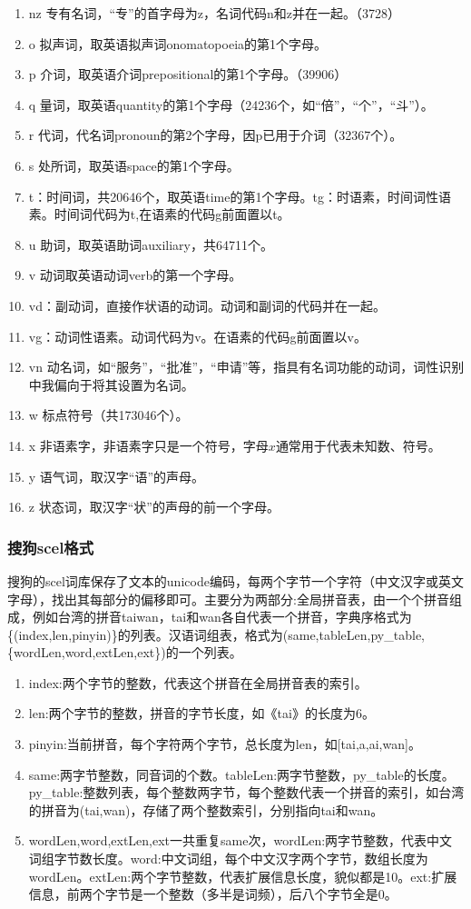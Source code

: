 \begin{enumerate}[(1)]
\item nz 专有名词，“专”的首字母为z，名词代码n和z并在一起。（3728）
\item o 拟声词，取英语拟声词onomatopoeia的第1个字母。
\item p 介词，取英语介词prepositional的第1个字母。（39906）
\item q 量词，取英语quantity的第1个字母（24236个，如“倍”，“个”，“斗”）。
\item r 代词，代名词pronoun的第2个字母，因p已用于介词（32367个）。
\item s 处所词，取英语space的第1个字母。
\item t：时间词，共20646个，取英语time的第1个字母。tg：时语素，时间词性语素。时间词代码为t,在语素的代码g前面置以t。
\item u 助词，取英语助词auxiliary，共64711个。
\item v 动词取英语动词verb的第一个字母。
\item vd：副动词，直接作状语的动词。动词和副词的代码并在一起。
\item vg：动词性语素。动词代码为v。在语素的代码g前面置以v。
\item vn 动名词，如“服务”，“批准”，“申请”等，指具有名词功能的动词，词性识别中我偏向于将其设置为名词。
\item w 标点符号（共173046个）。
\item x 非语素字，非语素字只是一个符号，字母$x$通常用于代表未知数、符号。
\item y 语气词，取汉字“语”的声母。
\item z 状态词，取汉字“状”的声母的前一个字母。
\end{enumerate}
\subsubsection{搜狗scel格式}
\par 搜狗的scel词库保存了文本的unicode编码，每两个字节一个字符（中文汉字或英文字母），找出其每部分的偏移即可。主要分为两部分:全局拼音表，由一个个拼音组成，例如台湾的拼音taiwan，tai和wan各自代表一个拼音，字典序格式为\{(index,len,pinyin)\}的列表。汉语词组表，格式为(same,tableLen,py\_table,\{wordLen,word,extLen,ext\})的一个列表。
\begin{enumerate}[(1)]
\item index:两个字节的整数，代表这个拼音在全局拼音表的索引。
\item len:两个字节的整数，拼音的字节长度，如《tai》的长度为6。
\item pinyin:当前拼音，每个字符两个字节，总长度为len，如[tai,a,ai,wan]。
\item same:两字节整数，同音词的个数。tableLen:两字节整数，py\_table的长度。py\_table:整数列表，每个整数两字节，每个整数代表一个拼音的索引，如台湾的拼音为(tai,wan)，存储了两个整数索引，分别指向tai和wan。
\item {wordLen,word,extLen,ext}一共重复same次，wordLen:两字节整数，代表中文词组字节数长度。word:中文词组，每个中文汉字两个字节，数组长度为wordLen。extLen:两个字节整数，代表扩展信息长度，貌似都是10。ext:扩展信息，前两个字节是一个整数（多半是词频），后八个字节全是0。
\end{enumerate}
